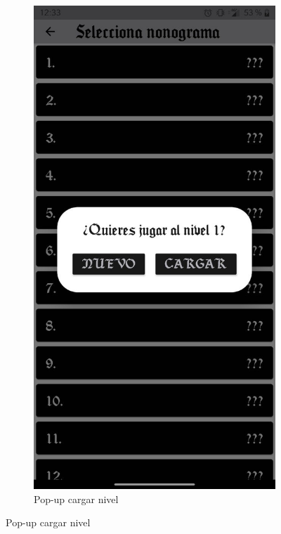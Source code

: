 \begin{figure}[H]
\begin{subfigure}[b]{0.45\linewidth}
      \label{fig:man1-3}
    \end{subfigure}
    \begin{subfigure}[b]{0.45\linewidth}
      \includegraphics[width=\linewidth]{images/man4.jpeg}
      \caption{Pop-up cargar nivel}
      \label{fig:man1-4}
    \end{subfigure}
    \caption{Pop-up cargar nivel}
    \label{fig:man2}
  \end{figure}

